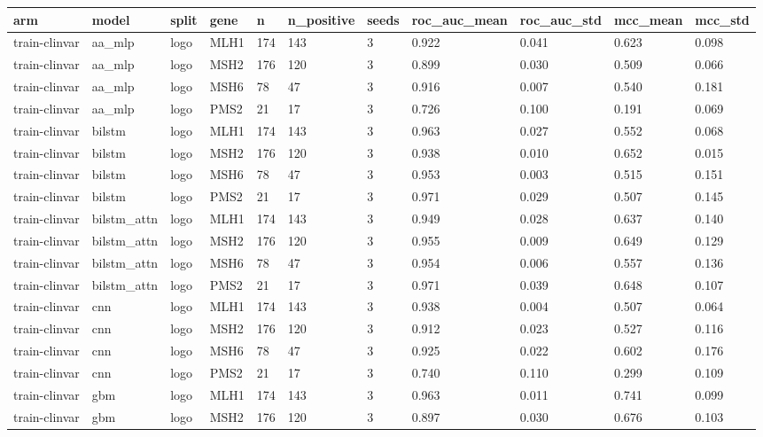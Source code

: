 \begin{table}[t]
\centering
\small
\begin{tabular}{lllllllllll}
\toprule
arm & model & split & gene & n & n\_positive & seeds & roc\_auc\_mean & roc\_auc\_std & mcc\_mean & mcc\_std \\
\midrule
train-clinvar & aa\_mlp & logo & MLH1 & 174 & 143 & 3 & 0.922 & 0.041 & 0.623 & 0.098 \\
train-clinvar & aa\_mlp & logo & MSH2 & 176 & 120 & 3 & 0.899 & 0.030 & 0.509 & 0.066 \\
train-clinvar & aa\_mlp & logo & MSH6 & 78 & 47 & 3 & 0.916 & 0.007 & 0.540 & 0.181 \\
train-clinvar & aa\_mlp & logo & PMS2 & 21 & 17 & 3 & 0.726 & 0.100 & 0.191 & 0.069 \\
train-clinvar & bilstm & logo & MLH1 & 174 & 143 & 3 & 0.963 & 0.027 & 0.552 & 0.068 \\
train-clinvar & bilstm & logo & MSH2 & 176 & 120 & 3 & 0.938 & 0.010 & 0.652 & 0.015 \\
train-clinvar & bilstm & logo & MSH6 & 78 & 47 & 3 & 0.953 & 0.003 & 0.515 & 0.151 \\
train-clinvar & bilstm & logo & PMS2 & 21 & 17 & 3 & 0.971 & 0.029 & 0.507 & 0.145 \\
train-clinvar & bilstm\_attn & logo & MLH1 & 174 & 143 & 3 & 0.949 & 0.028 & 0.637 & 0.140 \\
train-clinvar & bilstm\_attn & logo & MSH2 & 176 & 120 & 3 & 0.955 & 0.009 & 0.649 & 0.129 \\
train-clinvar & bilstm\_attn & logo & MSH6 & 78 & 47 & 3 & 0.954 & 0.006 & 0.557 & 0.136 \\
train-clinvar & bilstm\_attn & logo & PMS2 & 21 & 17 & 3 & 0.971 & 0.039 & 0.648 & 0.107 \\
train-clinvar & cnn & logo & MLH1 & 174 & 143 & 3 & 0.938 & 0.004 & 0.507 & 0.064 \\
train-clinvar & cnn & logo & MSH2 & 176 & 120 & 3 & 0.912 & 0.023 & 0.527 & 0.116 \\
train-clinvar & cnn & logo & MSH6 & 78 & 47 & 3 & 0.925 & 0.022 & 0.602 & 0.176 \\
train-clinvar & cnn & logo & PMS2 & 21 & 17 & 3 & 0.740 & 0.110 & 0.299 & 0.109 \\
train-clinvar & gbm & logo & MLH1 & 174 & 143 & 3 & 0.963 & 0.011 & 0.741 & 0.099 \\
train-clinvar & gbm & logo & MSH2 & 176 & 120 & 3 & 0.897 & 0.030 & 0.676 & 0.103 \\

\end{tabular}
\end{table}
